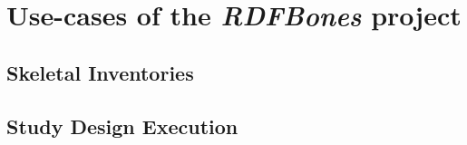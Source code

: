 

\section{Use-cases of the \textit{RDFBones} project}

\subsection{Skeletal Inventories}

\subsection{Study Design Execution}
